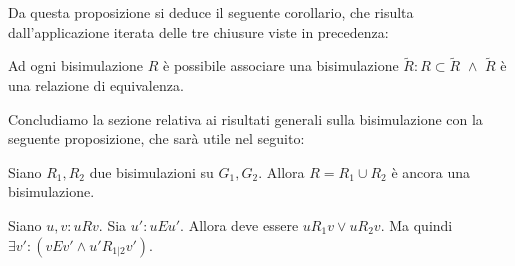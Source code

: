 Da questa proposizione si deduce il seguente corollario, che risulta dall'applicazione iterata delle tre chiusure viste in precedenza:
\begin{corollary}
    Ad ogni bisimulazione $R$ è possibile associare una bisimulazione $\widetilde{R} : R \subset \widetilde{R} \,\,\land\,\, \widetilde{R}$ è una relazione di equivalenza.
    \label{cor:bisimulation_eqrel}
\end{corollary}
Concludiamo la sezione relativa ai risultati generali sulla bisimulazione con la seguente proposizione, che sarà utile nel seguito:
\begin{proposition}
    Siano $R_1, R_2$ due bisimulazioni su $G_1, G_2$. Allora $R = R_1 \cup R_2$ è ancora una bisimulazione.
    \label{obs:bisimulation_union}
\end{proposition}
\begin{proof2}
    Siano $u,v : u R v$. Sia $u' : u E u'$. Allora deve essere $u R_1 v \lor u R_2 v$. Ma quindi $\exists v' : (v E v' \land u' R_{1|2} v')$.
\end{proof2}

